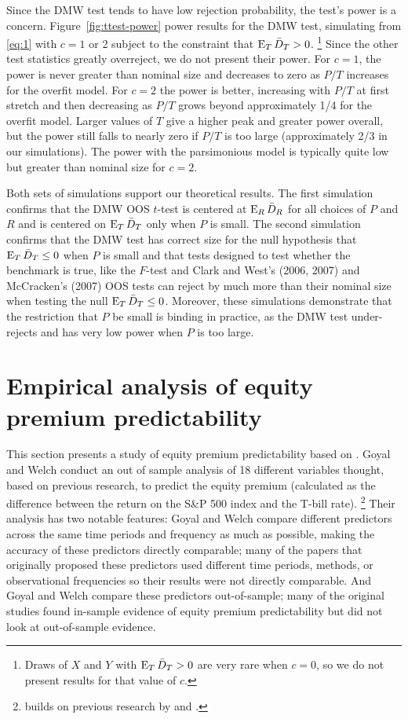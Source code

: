 \documentclass[12pt]{article}
\begin{document}
Since the DMW test tends to have low rejection probability, the test's
power is a concern.  Figure~\ref{fig:ttest-power} power results for
the DMW test, simulating from \eqref{eq:1} with $c = 1$ or 2 subject
to the constraint that $\operatorname{E}_T \bar{D}_{T} > 0$.%
\footnote{Draws of $X$ and $Y$ with $\operatorname{E}_T \bar{D}_{T} > 0$ are very rare
  when $c=0$, so we do not present results for that value of $c$.} %
Since the other test statistics greatly overreject, we do not present
their power.  For $c=1$, the power is never greater than nominal size
and decreases to zero as $P/T$ increases for the overfit model.  For
$c=2$ the power is better, increasing with $P/T$ at first stretch and
then decreasing as $P/T$ grows beyond approximately 1/4 for the
overfit model.  Larger values of $T$ give a higher peak and greater
power overall, but the power still falls to nearly zero if $P/T$ is
too large (approximately 2/3 in our simulations).  The power with the
parsimonious model is typically quite low but greater than nominal
size for $c = 2$.

Both sets of simulations support our theoretical results.  The first
simulation confirms that the DMW OOS $t$-test is centered at $\operatorname{E}_R
\bar{D}_{R}$ for all choices of $P$ and $R$ and is centered on $\operatorname{E}_T \bar{D}_{T}$
only when $P$ is small.  The second simulation confirms that the DMW
test has correct size for the null hypothesis that $\operatorname{E}_T \bar{D}_{T} \leq 0$
when $P$ is small and that tests designed to test whether the
benchmark is true, like the $F$-test and Clark and West's (2006, 2007)
and McCracken's (2007) OOS tests can reject by much more than their
nominal size when testing the null $\operatorname{E}_T \bar{D}_{T} \leq 0$.  Moreover,
these simulations demonstrate that the restriction that $P$ be small
is binding in practice, as the DMW test under-rejects and has very low
power when $P$ is too large.

\section{Empirical analysis of equity premium predictability}
\label{sec:empirics}

This section presents a study of equity premium predictability based
on \citet{GoW:08}. Goyal and Welch conduct an out of sample analysis
of 18 different variables thought, based on previous research, to
predict the equity premium (calculated as the difference between the
return on the S\&P 500 index and the T-bill rate).%
\footnote{\citet{GoW:08} builds on previous research by \citet{BoH:99}
  and \cite{GoW:03}.} %
Their analysis has two notable features: Goyal and Welch compare different
predictors across the same time periods and frequency as much as
possible, making the accuracy of these predictors directly comparable;
many of the papers that originally proposed these predictors used
different time periods, methods, or observational frequencies so their
results were not directly comparable. And Goyal and Welch compare
these predictors out-of-sample; many of the original studies found
in-sample evidence of equity premium predictability but did not look
at out-of-sample evidence.
\end{document}
